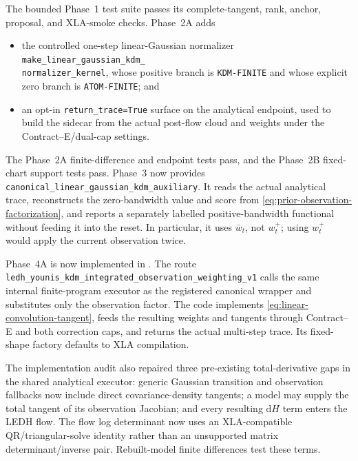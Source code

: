 \documentclass[11pt]{article}
\newcommand{\dd}{\mathrm{d}}
\begin{document}
The bounded Phase~1 test suite passes its complete-tangent, rank, anchor,
proposal, and XLA-smoke checks.  Phase~2A adds

\begin{itemize}[leftmargin=2em]
  \item the controlled one-step linear-Gaussian normalizer\\
        \texttt{make\_linear\_gaussian\_kdm\_}\\
        \texttt{normalizer\_kernel}, whose
        positive branch is \texttt{KDM-FINITE} and whose explicit zero branch
        is \texttt{ATOM-FINITE}; and
  \item an opt-in \texttt{return\_trace=True} surface on the analytical
        endpoint, used to build the sidecar from the actual post-flow cloud
        and weights under the Contract--E/dual-cap settings.
\end{itemize}

The Phase~2A finite-difference and endpoint tests pass, and the Phase~2B
fixed-chart support tests pass.  Phase~3 now provides
\texttt{canonical\_linear\_gaussian\_kdm\_auxiliary}.  It reads the actual
analytical trace, reconstructs the zero-bandwidth value and score from
\eqref{eq:prior-observation-factorization}, and reports a separately labelled
positive-bandwidth functional without feeding it into the reset.  In
particular, it uses $\bar w_t$, not $w_t^+$; using $w_t^+$ would apply the
current observation twice.

Phase~4A is now implemented in
.  The route
\texttt{ledh\_younis\_kdm\_integrated\_observation\_weighting\_v1} calls the
same internal finite-program executor as the registered canonical wrapper and
substitutes only the observation factor.  The code implements
\eqref{eq:linear-convolution-tangent}, feeds the resulting weights and
tangents through Contract--E and both correction caps, and returns the actual
multi-step trace.  Its fixed-shape factory defaults to XLA compilation.

The implementation audit also repaired three pre-existing total-derivative
gaps in the shared analytical executor: generic Gaussian transition and
observation fallbacks now include direct covariance-density tangents; a model
may supply the total tangent of its observation Jacobian; and every resulting
$\dd H$ term enters the LEDH flow.  The flow log determinant now uses an
XLA-compatible QR/triangular-solve identity rather than an unsupported matrix
determinant/inverse pair.  Rebuilt-model finite differences test these terms.
\end{document}
